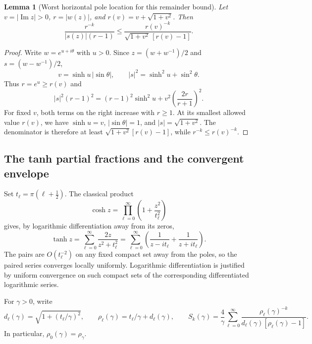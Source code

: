 \documentclass[11pt,letterpaper]{article}
\newtheorem{bsaLemma}{Lemma}[section]
\theoremstyle{remark}
\theoremstyle{plain}
\begin{document}
\begin{bsaLemma}[Worst horizontal pole location for this remainder bound]
\label{bsa:lem:bias-uniform}
Let $v=|\operatorname{Im}z|>0$, $r=|w(z)|$, and $r(v)=v+\sqrt{1+v^2}$. Then
\begin{equation}
 \frac{r^{-k}}{|s(z)|(r-1)}
 \le\frac{r(v)^{-k}}{\sqrt{1+v^2}\,[r(v)-1]}.
 \label{bsa:eq:bias-uniform}
\end{equation}
\end{bsaLemma}
\begin{proof}
Write $w=e^{u+i\theta}$ with $u>0$. Since $z=(w+w^{-1})/2$ and $s=(w-w^{-1})/2$,
\[
 v=\sinh u\,|\sin\theta|,\qquad
 |s|^2=\sinh^2u+\sin^2\theta.
\]
Thus $r=e^u\ge r(v)$ and
\begin{equation}
 |s|^2(r-1)^2
 =(r-1)^2\sinh^2u
 +v^2\left(\frac{2r}{r+1}\right)^2.
 \label{bsa:eq:denominator-monotone}
\end{equation}
For fixed $v$, both terms on the right increase with $r\ge1$. At its smallest allowed value $r(v)$, we have $\sinh u=v$, $|\sin\theta|=1$, and $|s|=\sqrt{1+v^2}$. The denominator is therefore at least $\sqrt{1+v^2}[r(v)-1]$, while $r^{-k}\le r(v)^{-k}$.
\end{proof}

\subsection{The tanh partial fractions and the convergent envelope}

Set $t_\ell=\pi(\ell+\tfrac12)$. The classical product
\begin{equation}
 \cosh z=\prod_{\ell=0}^\infty\left(1+\frac{z^2}{t_\ell^2}\right)
 \label{bsa:eq:cosh-product}
\end{equation}
\cite[Eq.~4.36.2]{bsa-dlmf} gives, by logarithmic differentiation away from its zeros,
\begin{equation}
 \tanh z=\sum_{\ell=0}^\infty\frac{2z}{z^2+t_\ell^2}
 =\sum_{\ell=0}^\infty
 \left(\frac1{z-it_\ell}+\frac1{z+it_\ell}\right).
 \label{bsa:eq:tanh-poles}
\end{equation}
The pairs are $O(t_\ell^{-2})$ on any fixed compact set away from the poles, so the paired series converges locally uniformly. Logarithmic differentiation is justified by uniform convergence on such compact sets of the corresponding differentiated logarithmic series.

For $\gamma>0$, write
\begin{equation}
 d_\ell(\gamma)=\sqrt{1+(t_\ell/\gamma)^2},\qquad
 \rho_\ell(\gamma)=t_\ell/\gamma+d_\ell(\gamma),\qquad
 S_k(\gamma)=\frac4\gamma\sum_{\ell=0}^\infty
 \frac{\rho_\ell(\gamma)^{-k}}{d_\ell(\gamma)[\rho_\ell(\gamma)-1]}.
 \label{bsa:eq:pole-envelope}
\end{equation}
In particular, $\rho_0(\gamma)=\rho_\gamma$.
\end{document}
